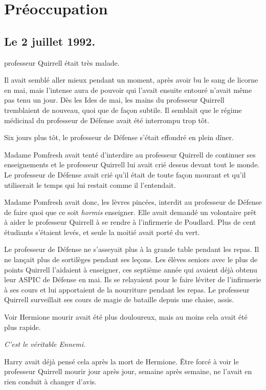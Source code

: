 \chapter{Préoccupation}

\section{Le 2 juillet 1992.}

 professeur Quirrell était très malade.

\hplettrineextrapara
Il avait semblé aller mieux pendant un moment, après avoir bu le sang de licorne en mai, mais l'intense aura de pouvoir qui l'avait ensuite entouré n'avait même pas tenu un jour. Dès les Ides de mai, les mains du professeur Quirrell tremblaient de nouveau, quoi que de façon subtile. Il semblait que le régime médicinal du professeur de Défense avait été interrompu trop tôt.

Six jours plus tôt, le professeur de Défense s'était effondré en plein dîner.

Madame Pomfresh avait tenté d'interdire au professeur Quirrell de continuer ses enseignements et le professeur Quirrell lui avait crié dessus devant tout le monde. Le professeur de Défense avait crié qu'il était de toute façon mourant et qu'il utiliserait le temps qui lui restait comme il l'entendait.

Madame Pomfresh avait donc, les lèvres pincées, interdit au professeur de Défense de faire quoi que ce soit \emph{hormis} enseigner. Elle avait demandé un volontaire prêt à aider le professeur Quirrell à se rendre à l'infirmerie de Poudlard. Plus de cent étudiants s'étaient levés, et seule la moitié avait porté du vert.

Le professeur de Défense ne s'asseyait plus à la grande table pendant les repas. Il ne lançait plus de sortilèges pendant ses leçons. Les élèves seniors avec le plus de points Quirrell l'aidaient à enseigner, ces septième année qui avaient déjà obtenu leur ASPIC de Défense en mai. Ils se relayaient pour le faire léviter de l'infirmerie à ses cours et lui apportaient de la nourriture pendant les repas. Le professeur Quirrell surveillait ses cours de magie de bataille depuis une chaise, assis.

Voir Hermione mourir avait été plus douloureux, mais au moins cela avait été plus rapide.

\emph{C'est le véritable Ennemi.}

Harry avait déjà pensé cela après la mort de Hermione. Être forcé à voir le professeur Quirrell mourir jour après jour, semaine après semaine, ne l'avait en rien conduit à changer d'avis.

